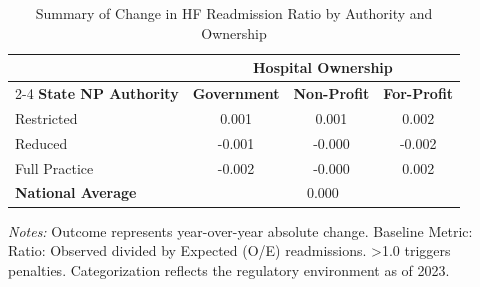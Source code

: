 \begin{table}[htbp]
    \centering
    \caption{Summary of Change in HF Readmission Ratio by Authority and Ownership}
    \label{tab:d_rrp_excess_ratio_hf_own}
    \vspace{0.2cm}
    \begin{tabular}{lccc}
        \toprule
        & \multicolumn{3}{c}{\textbf{Hospital Ownership}} \\
        \cmidrule(lr){2-4}
        \textbf{State NP Authority} & \textbf{Government} & \textbf{Non-Profit} & \textbf{For-Profit} \\
        \midrule
        Restricted & 0.001 & 0.001 & 0.002 \\
        Reduced & -0.001 & -0.000 & -0.002 \\
        Full Practice & -0.002 & -0.000 & 0.002 \\
        \midrule
        \textbf{National Average} & \multicolumn{3}{c}{0.000} \\
        \bottomrule
    \end{tabular}
    \vspace{0.1cm}
    \begin{minipage}{0.85\textwidth}
        \footnotesize \textit{Notes:} Outcome represents year-over-year absolute change. Baseline Metric: Ratio: Observed divided by Expected (O/E) readmissions. >1.0 triggers penalties. Categorization reflects the regulatory environment as of 2023.
    \end{minipage}
\end{table}